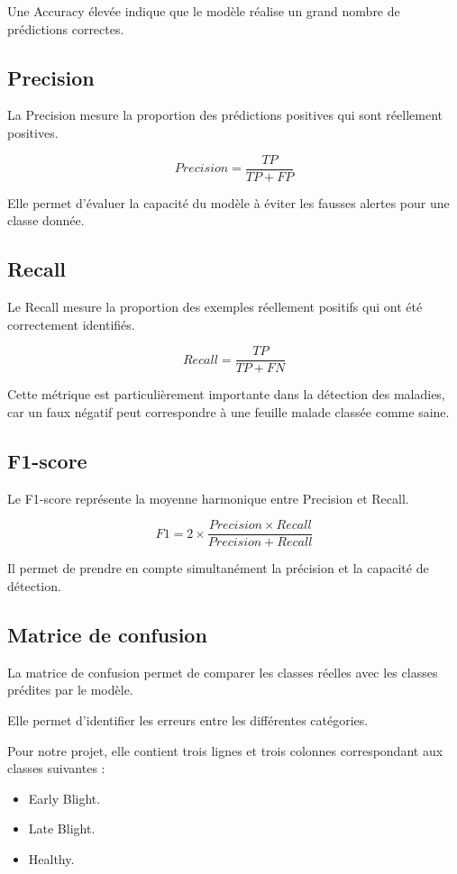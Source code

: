 \documentclass[12pt,a4paper,oneside]{report}
\begin{document}
Une Accuracy élevée indique que le modèle réalise
un grand nombre de prédictions correctes.

\subsection{Precision}

La Precision mesure la proportion des prédictions
positives qui sont réellement positives.

\[
Precision=\frac{TP}{TP+FP}
\]

Elle permet d'évaluer la capacité du modèle à éviter
les fausses alertes pour une classe donnée.

\subsection{Recall}

Le Recall mesure la proportion des exemples réellement
positifs qui ont été correctement identifiés.

\[
Recall=\frac{TP}{TP+FN}
\]

Cette métrique est particulièrement importante dans
la détection des maladies, car un faux négatif peut
correspondre à une feuille malade classée comme saine.

\subsection{F1-score}

Le F1-score représente la moyenne harmonique entre
Precision et Recall.

\[
F1=2\times
\frac{Precision\times Recall}
{Precision+Recall}
\]

Il permet de prendre en compte simultanément
la précision et la capacité de détection.

\subsection{Matrice de confusion}

La matrice de confusion permet de comparer les
classes réelles avec les classes prédites par le modèle.

Elle permet d'identifier les erreurs entre les différentes
catégories.

Pour notre projet, elle contient trois lignes et
trois colonnes correspondant aux classes suivantes :

\begin{itemize}
    \item Early Blight.
    \item Late Blight.
    \item Healthy.
\end{itemize}
\end{document}
